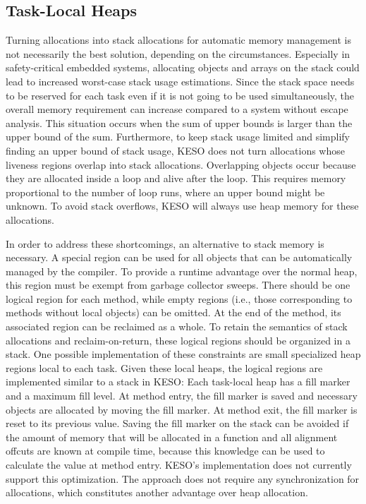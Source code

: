 		\subsection{Task-Local Heaps}
			\label{sub:eea:opt:ldh}
			Turning allocations into stack allocations for automatic memory management is not necessarily the best solution,
			depending on the circumstances. Especially in safety-critical embedded systems, allocating objects and arrays on
			the stack could lead to increased worst-case stack usage estimations. Since the stack space needs to be reserved
			for each task even if it is not going to be used simultaneously, the overall memory requirement can increase
			compared to a system without escape analysis. This situation occurs when the sum of upper bounds is larger than
			the upper bound of the sum. Furthermore, to keep stack usage limited and simplify finding an upper bound of stack
			usage, KESO does not turn allocations whose liveness regions overlap into stack allocations. Overlapping objects
			occur because they are allocated inside a loop and alive after the loop. This requires memory proportional to the
			number of loop runs, where an upper bound might be unknown. To avoid stack overflows, KESO will always use heap
			memory for these allocations.

			In order to address these shortcomings, an alternative to stack memory is necessary. A special region can be used
			for all objects that can be automatically managed by the compiler. To provide a runtime advantage over the normal
			heap, this region must be exempt from garbage collector sweeps. There should be one logical region for each
			method, while empty regions (i.e., those corresponding to methods without local objects) can be omitted. At the
			end of the method, its associated region can be reclaimed as a whole. To retain the semantics of stack allocations
			and reclaim-on-return, these logical regions should be organized in a stack. One possible implementation of these
			constraints are small specialized heap regions local to each task. Given these local heaps, the logical regions
			are implemented similar to a stack in KESO: Each task-local heap has a fill marker and a maximum fill level. At
			method entry, the fill marker is saved and necessary objects are allocated by moving the fill marker. At method
			exit, the fill marker is reset to its previous value. Saving the fill marker on the stack can be avoided if the
			amount of memory that will be allocated in a function and all alignment offcuts are known at compile time, because
			this knowledge can be used to calculate the value at method entry. KESO's implementation does not currently
			support this optimization. The approach does not require any synchronization for allocations, which constitutes
			another advantage over heap allocation.

